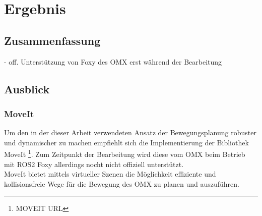 \section{Ergebnis}
\subsection{Zusammenfassung}
- off. Unterstützung von Foxy des OMX erst während der Bearbeitung
\subsection{Ausblick}
\subsubsection{MoveIt}
Um den in der dieser Arbeit verwendeten Ansatz der Bewegungsplanung robuster und dynamischer zu machen empfiehlt sich die Implementierung der Bibliothek MoveIt \footnote{MOVEIT URL}. Zum Zeitpunkt der Bearbeitung wird diese vom OMX beim Betrieb mit \ac{ROS2} Foxy allerdings nocht nicht offiziell unterstützt.\\
MoveIt bietet mittels virtueller Szenen die Möglichkeit effiziente und kollisionsfreie Wege für die Bewegung des OMX zu planen und auszuführen.
